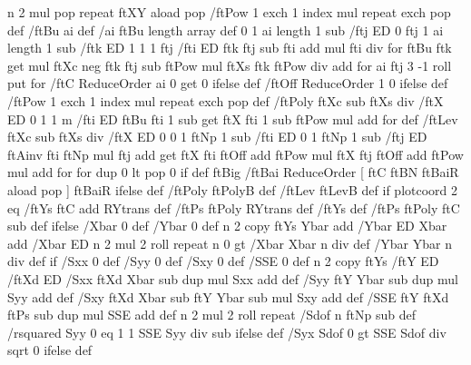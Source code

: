 {  n 2 mul { pop } repeat ftXY aload pop
  /ftPow { 1 exch { 1 index mul } repeat exch pop } def %
  /ftBu ai def
  /ai ftBu length array def
  0 1 ai length 1 sub { /ftj ED
    0
    ftj 1 ai length 1 sub { /ftk ED
      1 1 1 ftj { /fti ED ftk ftj sub fti add mul fti div } for
      ftBu ftk get mul ftXc neg ftk ftj sub ftPow mul ftXs ftk ftPow div add
    } for
    ai ftj 3 -1 roll put
  } for
  /ftC ReduceOrder { ai 0 get } { 0 } ifelse def
  /ftOff ReduceOrder { 1 } { 0 } ifelse def
  /ftPow { 1 exch { 1 index mul } repeat exch pop } def %
  /ftPoly { %
    ftXc sub ftXs div /ftX ED
    0 1 1 m { /fti ED ftBu fti 1 sub get ftX fti 1 sub ftPow mul add } for } def
  /ftLev { %
    ftXc sub ftXs div /ftX ED 0
    0 1 ftNp 1 sub { /fti ED
      0 1 ftNp 1 sub { /ftj ED
        ftAinv fti ftNp mul ftj add get
        ftX fti ftOff add ftPow mul ftX ftj ftOff add ftPow mul add
      } for
    } for
    dup 0 lt { pop 0 } if } def
  ftBig {%
    /ftBai ReduceOrder { [ ftC ftBN ftBaiR aload pop ] }{ ftBaiR } ifelse def
    /ftPoly { ftPolyB } def /ftLev { ftLevB } def
  } if
  plotcoord 2 eq {%
    /ftYs { ftC add RYtrans } def %
    /ftPs { ftPoly RYtrans } def  %
  }{%
    /ftYs { } def
    /ftPs { ftPoly ftC sub } def
  } ifelse
  /Xbar 0 def /Ybar 0 def %
  n {
    2 copy ftYs Ybar add /Ybar ED Xbar add /Xbar ED
    n 2 mul 2 roll
  } repeat
  n 0 gt { /Xbar Xbar n div def /Ybar Ybar n div def } if
  /Sxx 0 def /Syy 0 def /Sxy 0 def %
  /SSE 0 def                       %
  n {
    2 copy ftYs /ftY ED /ftXd ED
    /Sxx ftXd Xbar sub dup mul Sxx add def
    /Syy ftY Ybar sub dup mul Syy add def
    /Sxy ftXd Xbar sub ftY Ybar sub mul Sxy add def
    /SSE ftY ftXd ftPs sub dup mul SSE add def
    n 2 mul 2 roll
  } repeat
  /Sdof n ftNp sub def %
  /rsquared Syy 0 eq { 1 } { 1 SSE Syy div sub } ifelse def
  /Syx Sdof 0 gt { SSE Sdof div sqrt } { 0 } ifelse def %
}
